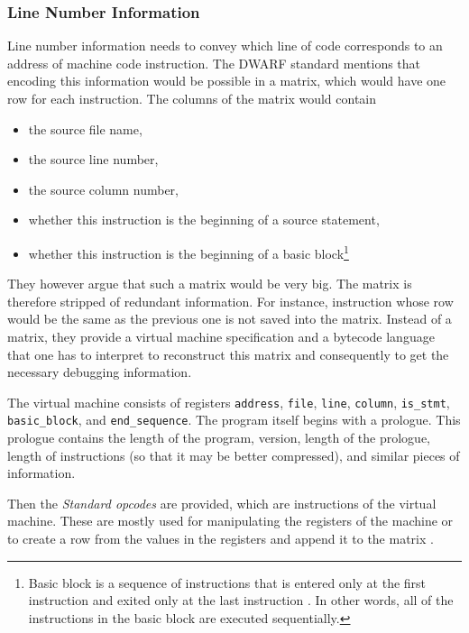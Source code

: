 \subsubsection{Line Number Information}
Line number information needs to convey which line of code corresponds to an
address of machine code instruction. The DWARF standard \cite{dwarf} mentions
that encoding this information would be possible in a matrix, which would have
one row for each instruction. The columns of the matrix would contain
\begin{itemize}
    \item the source file name,
    \item the source line number,
    \item the source column number,
    \item whether this instruction is the beginning of a source statement,
    \item whether this instruction is the beginning of a basic
        block\footnote{Basic block is a sequence of instructions that is
        entered only at the first instruction and exited only at the last
        instruction \cite{dwarf}. In other words, all of the instructions in
        the basic block are executed sequentially.}
\end{itemize}
They however argue that such a matrix would be very big. The matrix is
therefore stripped of redundant information. For instance, instruction whose
row would be the same as the previous one is not saved into the matrix. Instead
of a matrix, they provide a virtual machine specification and a bytecode
language that one has to interpret to reconstruct this matrix and consequently
to get the necessary debugging information.

The virtual machine consists of registers \texttt{address}, \texttt{file},
\texttt{line}, \texttt{column}, \texttt{is\_stmt}, \texttt{basic\_block}, and
\texttt{end\_sequence}. The program itself begins with a prologue. This
prologue contains the length of the program, version, length of the prologue,
length of instructions (so that it may be better compressed), and similar
pieces of information. 

Then the \textit{Standard opcodes} are provided, which are instructions of the
virtual machine. These are mostly used for manipulating the registers of the
machine or to create a row from the values in the registers and append it to
the matrix \cite{dwarf}. 

